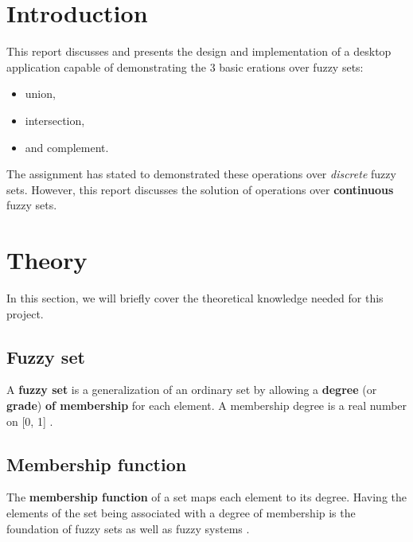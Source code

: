 \documentclass[12pt,a4paper,titlepage,final]{article}
\begin{document}
\def\author{Attila Večerek}
\def\email{xvecer17@stud.fit.vutbr.cz}
\def\projname{Demonstartion of Basic Fuzzy Set Operations }


\pagestyle{plain}
\setcounter{page}{1}
\tableofcontents

\newpage
\pagestyle{plain}
\setcounter{page}{1}


\section{Introduction} \label{introduction}
This report discusses and presents the design and implementation of a desktop application capable of demonstrating the 3 basic erations over fuzzy sets:

\begin{itemize}
\item union,
\item intersection,
\item and complement.
\end{itemize}

The assignment has stated to demonstrated these operations over \textit{discrete} fuzzy sets. However, this report discusses the solution of operations over \textbf{continuous} fuzzy sets.


\section{Theory} \label{theory}
In this section, we will briefly cover the theoretical knowledge needed for this project.

\subsection{Fuzzy set}
A \textbf{fuzzy set} is a generalization of an ordinary set by allowing a \textbf{degree} (or \textbf{grade}) \textbf{of membership} for each element. A membership degree is a real number on [0, 1] \cite{fuzzy}.

\subsection{Membership function}
The \textbf{membership function} of a set maps each element to its degree. Having the elements of the set being associated with a degree of membership is the foundation of fuzzy sets as well as fuzzy systems \cite{fuzzy}.
\end{document}
